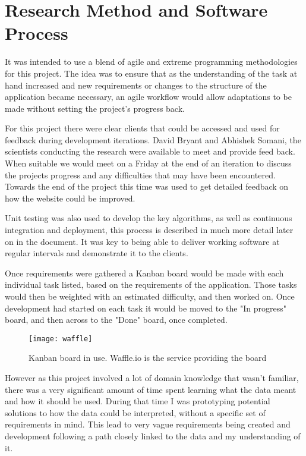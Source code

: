 
\section{Research Method and Software Process}
It was intended to use a blend of agile and extreme programming methodologies for this project. The idea was to ensure that as the understanding of the task at hand increased and new requirements or changes to the structure of the application became necessary, an agile workflow would allow adaptations to be made without setting the project's progress back. 

For this project there were clear clients that could be accessed and used for feedback during development iterations. David Bryant and Abhishek Somani, the scientists conducting the research were available to meet and provide feed back. When suitable we would meet on a Friday at the end of an iteration to discuss the projects progress and any difficulties that may have been encountered. Towards the end of the project this time was used to get detailed feedback on how the website could be improved. 

Unit testing was also used to develop the key algorithms, as well as continuous integration and deployment, this process is described in much more detail later on in the document. It was key to being able to deliver working software at regular intervals and demonstrate it to the clients. 

Once requirements were gathered a Kanban board would be made with each individual task listed, based on the requirements of the application. Those tasks would then be weighted with an estimated difficulty, and then worked on. Once development had started on each task it would be moved to the "In progress" board, and then across to the "Done" board, once completed. 

\begin{figure}[ht!]
\begin{center}
\texttt{[image: waffle]}
\caption{Kanban board in use. Waffle.io is the service providing the board}
\end{center}
\end{figure}

However as this project involved a lot of domain knowledge that wasn't familiar, there was a very significant amount of time spent learning what the data meant and how it should be used. During that time I was prototyping potential solutions to how the data could be interpreted, without a specific set of requirements in mind. This lead to very vague requirements being created and development following a path closely linked to the data and my understanding of it. 


